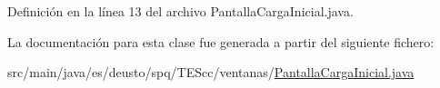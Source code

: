 Definición en la línea 13 del archivo Pantalla\+Carga\+Inicial.\+java.



La documentación para esta clase fue generada a partir del siguiente fichero\+:\begin{DoxyCompactItemize}
\item 
src/main/java/es/deusto/spq/\+T\+E\+Scc/ventanas/\hyperlink{_pantalla_carga_inicial_8java}{Pantalla\+Carga\+Inicial.\+java}\end{DoxyCompactItemize}
